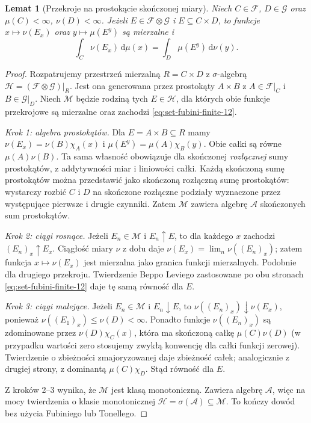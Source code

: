 \documentclass[11pt,a4paper,oneside]{book}
\numberwithin{equation}{chapter}
\theoremstyle{plain}
\newtheorem{lemat}[twierdzenie]{Lemat}
\theoremstyle{definition}
\theoremstyle{remark}
\begin{document}
\begin{lemat}[Przekroje na prostokącie skończonej miary]
\label{lem:finite-rectangle-sections-12}
Niech $C\in\mathcal F$, $D\in\mathcal G$ oraz
$\mu(C)<\infty$, $\nu(D)<\infty$. Jeżeli
$E\in\mathcal F\otimes\mathcal G$ i $E\subseteq C\times D$,
to funkcje $x\mapsto\nu(E_x)$ oraz
$y\mapsto\mu(E^y)$ są mierzalne i
\begin{equation}\label{eq:set-fubini-finite-12}
\int_C\nu(E_x)\,\mathrm d\mu(x)
=\int_D\mu(E^y)\,\mathrm d\nu(y).
\end{equation}
\end{lemat}
\begin{proof}
Rozpatrujemy przestrzeń mierzalną
$R=C\times D$ z $\sigma$-algebrą
$\mathcal H=(\mathcal F\otimes\mathcal G)|_R$.
Jest ona generowana przez prostokąty
$A\times B$ z $A\in\mathcal F|_C$ i
$B\in\mathcal G|_D$. Niech $\mathcal M$ będzie
rodziną tych $E\in\mathcal H$, dla których
obie funkcje przekrojowe są mierzalne oraz zachodzi
\eqref{eq:set-fubini-finite-12}.

\emph{Krok 1: algebra prostokątów.}
Dla $E=A\times B\subseteq R$ mamy
$\nu(E_x)=\nu(B)\chi_A(x)$ i
$\mu(E^y)=\mu(A)\chi_B(y)$. Obie całki
są równe $\mu(A)\nu(B)$.
Ta sama własność obowiązuje dla skończonej
\emph{rozłącznej} sumy prostokątów, z addytywności
miar i liniowości całki. Każdą skończoną sumę
prostokątów można przedstawić jako skończoną
rozłączną sumę prostokątów: wystarczy rozbić $C$
i $D$ na skończone rozłączne podziały wyznaczone
przez występujące pierwsze i drugie czynniki.
Zatem $\mathcal M$ zawiera algebrę $\mathcal A$
skończonych sum prostokątów.

\emph{Krok 2: ciągi rosnące.}
Jeżeli $E_n\in\mathcal M$ i $E_n\uparrow E$,
to dla każdego $x$ zachodzi $(E_n)_x\uparrow E_x$.
Ciągłość miary $\nu$ z dołu daje
$\nu(E_x)=\lim_n\nu((E_n)_x)$; zatem funkcja
$x\mapsto\nu(E_x)$ jest mierzalna jako granica
funkcji mierzalnych. Podobnie dla drugiego przekroju.
Twierdzenie Beppo Leviego zastosowane po obu stronach
\eqref{eq:set-fubini-finite-12} daje tę samą
równość dla $E$.

\emph{Krok 3: ciągi malejące.}
Jeżeli $E_n\in\mathcal M$ i $E_n\downarrow E$,
to $\nu((E_n)_x)\downarrow\nu(E_x)$, ponieważ
$\nu((E_1)_x)\le\nu(D)<\infty$. Ponadto funkcje
$\nu((E_n)_x)$ są zdominowane przez
$\nu(D)\chi_C(x)$, która ma skończoną
całkę $\mu(C)\nu(D)$ (w przypadku wartości zero
stosujemy zwykłą konwencję dla całki funkcji zerowej).
Twierdzenie o zbieżności zmajoryzowanej daje zbieżność
całek; analogicznie z drugiej strony, z dominantą
$\mu(C)\chi_D$. Stąd równość dla $E$.

Z kroków 2--3 wynika, że $\mathcal M$ jest klasą
monotoniczną. Zawiera algebrę $\mathcal A$, więc
na mocy twierdzenia o klasie monotonicznej
$\mathcal H=\sigma(\mathcal A)\subseteq\mathcal M$.
To kończy dowód bez użycia Fubiniego lub Tonellego.
\end{proof}
\end{document}
